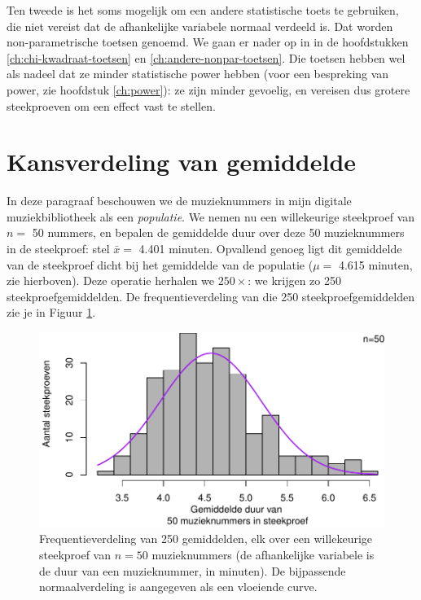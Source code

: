 \documentclass[
]{book}
\begin{document}
Ten tweede is het soms mogelijk om een andere statistische toets te
gebruiken, die niet vereist dat de afhankelijke variabele normaal
verdeeld is. Dat worden non-parametrische toetsen genoemd. We gaan er
nader op in in de hoofdstukken \ref{ch:chi-kwadraat-toetsen} en
\ref{ch:andere-nonpar-toetsen}.
Die toetsen hebben wel als nadeel
dat ze minder statistische power hebben (voor een bespreking van power,
zie hoofdstuk \ref{ch:power}): ze zijn minder gevoelig, en vereisen dus grotere
steekproeven om een effect vast te stellen.

\hypertarget{sec:CentraalLimietTheorema}{%
\section{Kansverdeling van gemiddelde}\label{sec:CentraalLimietTheorema}}

In deze paragraaf beschouwen we de muzieknummers in mijn digitale
muziekbibliotheek als een \emph{populatie}. We nemen nu een willekeurige
steekproef van \(n=\) 50 nummers, en bepalen de gemiddelde duur over deze
50 muzieknummers in de steekproef:
stel \(\bar{x} =\) 4.401 minuten. Opvallend
genoeg ligt dit gemiddelde van de steekproef dicht bij het gemiddelde
van de populatie (\(\mu =\) 4.615 minuten, zie hierboven).
Deze operatie herhalen we
\(250\times\): we krijgen zo 250 steekproefgemiddelden. De
frequentieverdeling van die 250 steekproefgemiddelden zie je in
Figuur \ref{fig:itunesmeanshist}.

\begin{figure}
\centering
\includegraphics{MS1NL-boek_files/figure-latex/itunesmeanshist-1.pdf}
\caption{\label{fig:itunesmeanshist}Frequentieverdeling van 250 gemiddelden, elk over een willekeurige steekproef van \(n=50\) muzieknummers (de afhankelijke variabele is de duur van een muzieknummer, in minuten). De bijpassende normaalverdeling is aangegeven als een vloeiende curve.}
\end{figure}
\end{document}
